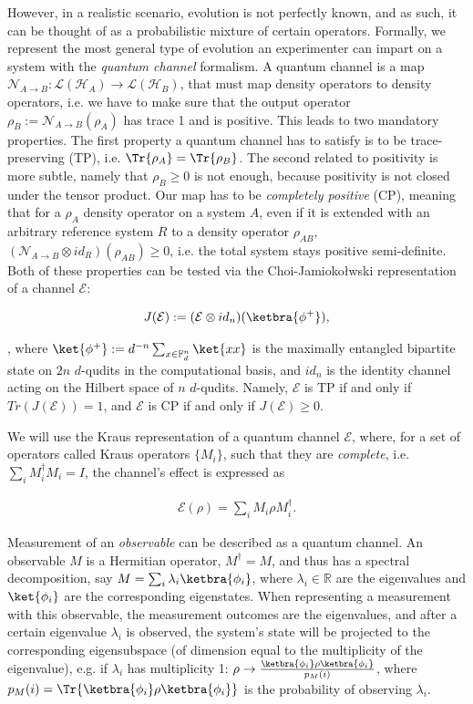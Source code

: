 However, in a realistic scenario, evolution is not perfectly known, and as such, it can be thought of as a probabilistic mixture of certain operators. Formally, we represent the most general type of evolution an experimenter can impart on a system with the \textit{quantum channel} formalism. A quantum channel is a map $\mathcal{N}_{A \rightarrow B}: \mathcal{L}(\mathcal{H}_A) \rightarrow \mathcal{L}(\mathcal{H}_B)$, that must map density operators to density operators, i.e. we have to make sure that the output operator $\rho_B := \mathcal{N}_{A \rightarrow B}(\rho_A)$ has trace 1 and is positive. This leads to two mandatory properties. The first property a quantum channel has to satisfy is to be trace-preserving (TP), i.e. $\Tr\{\rho_A\}=\Tr\{\rho_B\}$. The second related to positivity is more subtle, namely that $\rho_B \geq 0$ is not enough, because positivity is not closed under the tensor product. Our map has to be \textit{completely positive} (CP), meaning that for a $\rho_A$ density operator on a system $A$, even if it is extended with an arbitrary reference system $R$ to a density operator $\rho_{AB}$, $(\mathcal{N}_{A \rightarrow B} \otimes id_R) (\rho_{AB}) \geq 0$, i.e. the total system stays positive semi-definite. Both of these properties can be tested via the Choi-Jamiokołwski representation of a channel $\mathcal{E}$:

\begin{align}
J(\mathcal{E}) := (\mathcal{E} \otimes id_n)(\ketbra{\phi^+}),
\end{align}

, where $\ket{\phi^+}:=d^{-n} \sum_{x \in \mathbb{F}_d^n} \ket{xx}$ is the maximally entangled bipartite state on $2n$ $d$-qudits in the computational basis, and $id_n$ is the identity channel acting on the Hilbert space of $n$ $d$-qudits. 
Namely, $\mathcal{E}$ is TP if and only if $Tr(J(\mathcal{E})) = 1$, and $\mathcal{E}$ is CP if and only if $J(\mathcal{E}) \geq 0$. 

We will use the Kraus representation of a quantum channel $\mathcal{E}$, where, for a set of operators called Kraus operators $\{M_i\}$, such that they are \textit{complete}, i.e. $\sum_i M_i^\dagger M_i = I$, the channel's effect is expressed as

\begin{align}
\mathcal{E}(\rho)=\sum_i M_i \rho M_i^\dagger.
\end{align}

Measurement of an \textit{observable} can be described as a quantum channel. An observable $M$ is a Hermitian operator, $M^\dagger=M$, and thus has a spectral decomposition, say $M=\sum_i \lambda_i \ketbra{\phi_i}$, where $\lambda_i \in \mathbb{R}$ are the eigenvalues and $\ket{\phi_i}$ are the corresponding eigenstates. When representing a measurement with this observable, the measurement outcomes are the eigenvalues, and after a certain eigenvalue $\lambda_i$ is observed, the system's state will be projected to the corresponding eigensubspace (of dimension equal to the multiplicity of the eigenvalue), e.g. if $\lambda_i$ has multiplicity 1: $\rho \rightarrow \frac{\ketbra{\phi_i}\rho\ketbra{\phi_i}}{p_M(i)}$, where $p_M(i)=\Tr\{\ketbra{\phi_i}\rho\ketbra{\phi_i}\}$ is the probability of observing $\lambda_i$. 

